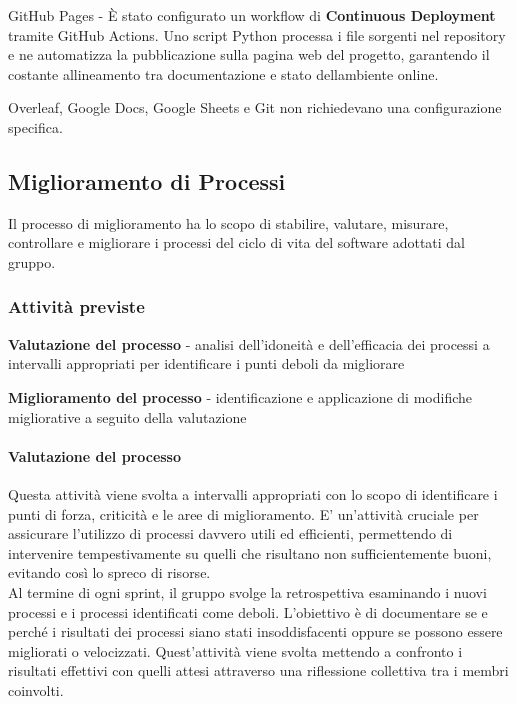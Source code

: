 \documentclass[12pt, a4paper]{article}
\begin{document}
GitHub Pages - È stato configurato un workflow di \textbf{Continuous
Deployment} tramite GitHub Actions. Uno script Python processa i file
sorgenti nel repository e ne automatizza la pubblicazione sulla pagina
web del progetto, garantendo il costante allineamento tra documentazione
e stato dell\textquotesingle ambiente online.

Overleaf, Google Docs, Google Sheets e Git non richiedevano una
configurazione specifica.

\subsection{Miglioramento di Processi}

Il processo di miglioramento ha lo scopo di stabilire, valutare,
misurare, controllare e migliorare i processi del ciclo di vita del
software adottati dal gruppo.

\subsubsection{Attività previste}

\textbf{Valutazione del processo} - analisi dell'idoneità e
dell'efficacia dei processi a intervalli appropriati per identificare i
punti deboli da migliorare

\textbf{Miglioramento del processo} - identificazione e applicazione di
modifiche migliorative a seguito della valutazione

\paragraph{Valutazione del processo}

Questa attività viene svolta a intervalli appropriati con lo scopo di
identificare i punti di forza, criticità e le aree di miglioramento. E'
un'attività cruciale per assicurare l'utilizzo di processi davvero utili
ed efficienti, permettendo di intervenire tempestivamente su quelli che
risultano non sufficientemente buoni, evitando così lo spreco di
risorse.\\
Al termine di ogni sprint, il gruppo svolge la retrospettiva esaminando
i nuovi processi e i processi identificati come deboli. L'obiettivo è di
documentare se e perché i risultati dei processi siano stati
insoddisfacenti oppure se possono essere migliorati o velocizzati.
Quest'attività viene svolta mettendo a confronto i risultati effettivi
con quelli attesi attraverso una riflessione collettiva tra i membri
coinvolti.
\end{document}
